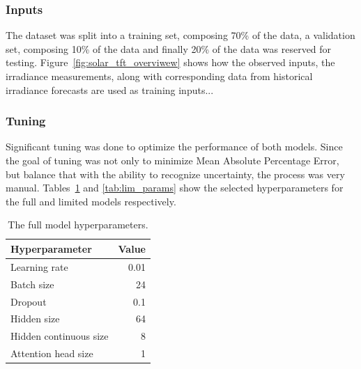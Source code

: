     \subsubsection{Inputs}
        The dataset was split into a training set, composing 70\% of the data, a validation set, composing 10\% of the data and finally 20\% of the data was reserved for testing.
        Figure~\ref{fig:solar_tft_overviwew} shows how the observed inputs, the irradiance measurements, along with corresponding data from historical irradiance forecasts are used as training inputs...
        
    \subsubsection{Tuning}
        Significant tuning was done to optimize the performance of both models. Since the goal of tuning was not only to minimize Mean Absolute Percentage Error, but balance that with the ability to recognize uncertainty, the process was very manual. Tables~\ref{tab:full_params} and \ref{tab:lim_params} show the selected hyperparameters for the full and limited models respectively.
    
        \begin{table}[ht!]
        \begin{center}
        \caption{The full model hyperparameters.
        \label{tab:full_params}}
        \vspace{0.5cm}
        \begin{tabular}{|l|r|}
        \hline
        \textbf{Hyperparameter} & \textbf{Value} \\ \hline
        Learning rate            & 0.01         \\ \hline
        Batch size              & 24            \\ \hline
        Dropout                 & 0.1            \\ \hline
        Hidden size            & 64         \\ \hline
        Hidden continuous size & 8         \\ \hline
        Attention head size   & 1         \\ \hline
        \end{tabular}
        
        \end{center}
        \end{table}
        
